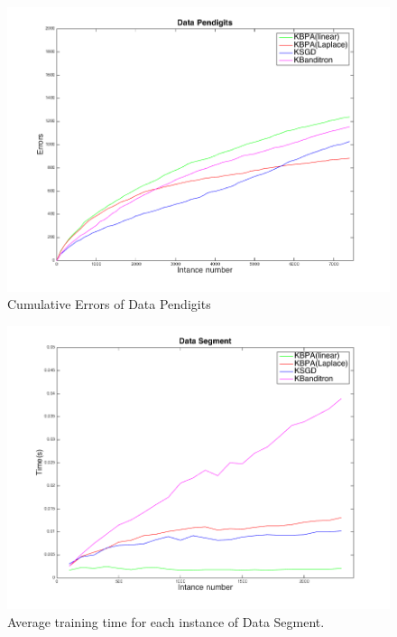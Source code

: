 \documentclass[preprint,12pt,authoryear]{elsarticle}
\begin{document}
\begin{figure}[h!]
	\centerline{
		\includegraphics[scale = 0.4]{figs/Pendigits_kernel_CM.png}}
	\caption{Cumulative Errors of Data Pendigits}
	\label{pic:PKCM}
\end{figure}


\begin{figure}[h!]
	\centerline{
		\includegraphics[scale = 0.4]{figs/Segment_kernel_T.png}}
	\caption{Average training time for each instance of Data Segment.}
	\label{pic:SKT}
\end{figure}
\end{document}
